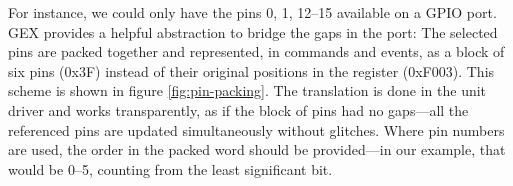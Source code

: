 For instance, we could only have the pins 0, 1, 12--15 available on a GPIO port. GEX provides a helpful abstraction to bridge the gaps in the port: The selected pins are packed together and represented, in commands and events, as a block of six pins (0x3F) instead of their original positions in the register (0xF003). This scheme is shown in figure \ref{fig:pin-packing}. The translation is done in the unit driver and works transparently, as if the block of pins had no gaps---all the referenced pins are updated simultaneously without glitches. Where pin numbers are used, the order in the packed word should be provided---in our example, that would be 0--5, counting from the least significant bit.




















